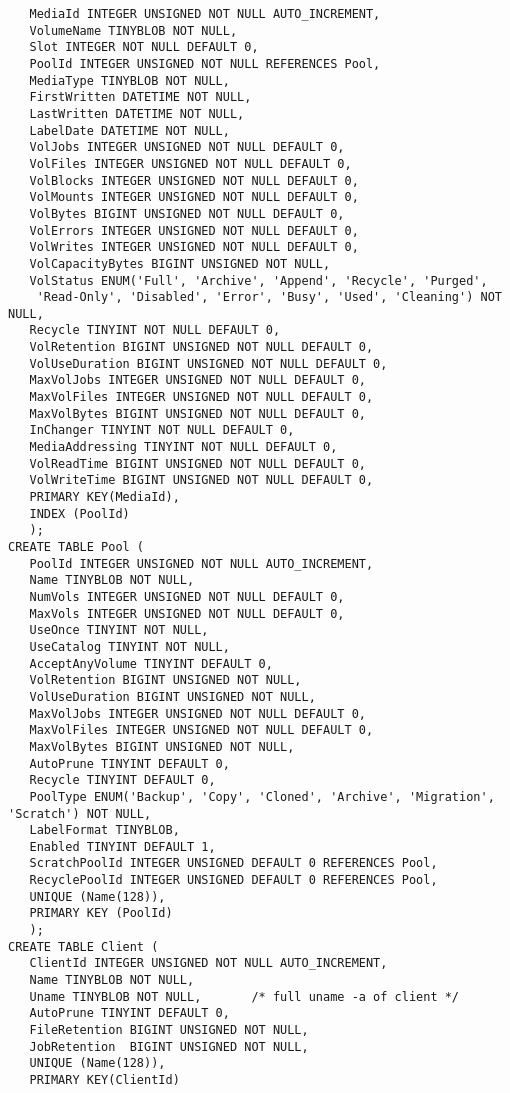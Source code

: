 {{{\begin{verbatim}
   MediaId INTEGER UNSIGNED NOT NULL AUTO_INCREMENT,
   VolumeName TINYBLOB NOT NULL,
   Slot INTEGER NOT NULL DEFAULT 0,
   PoolId INTEGER UNSIGNED NOT NULL REFERENCES Pool,
   MediaType TINYBLOB NOT NULL,
   FirstWritten DATETIME NOT NULL,
   LastWritten DATETIME NOT NULL,
   LabelDate DATETIME NOT NULL,
   VolJobs INTEGER UNSIGNED NOT NULL DEFAULT 0,
   VolFiles INTEGER UNSIGNED NOT NULL DEFAULT 0,
   VolBlocks INTEGER UNSIGNED NOT NULL DEFAULT 0,
   VolMounts INTEGER UNSIGNED NOT NULL DEFAULT 0,
   VolBytes BIGINT UNSIGNED NOT NULL DEFAULT 0,
   VolErrors INTEGER UNSIGNED NOT NULL DEFAULT 0,
   VolWrites INTEGER UNSIGNED NOT NULL DEFAULT 0,
   VolCapacityBytes BIGINT UNSIGNED NOT NULL,
   VolStatus ENUM('Full', 'Archive', 'Append', 'Recycle', 'Purged',
    'Read-Only', 'Disabled', 'Error', 'Busy', 'Used', 'Cleaning') NOT NULL,
   Recycle TINYINT NOT NULL DEFAULT 0,
   VolRetention BIGINT UNSIGNED NOT NULL DEFAULT 0,
   VolUseDuration BIGINT UNSIGNED NOT NULL DEFAULT 0,
   MaxVolJobs INTEGER UNSIGNED NOT NULL DEFAULT 0,
   MaxVolFiles INTEGER UNSIGNED NOT NULL DEFAULT 0,
   MaxVolBytes BIGINT UNSIGNED NOT NULL DEFAULT 0,
   InChanger TINYINT NOT NULL DEFAULT 0,
   MediaAddressing TINYINT NOT NULL DEFAULT 0,
   VolReadTime BIGINT UNSIGNED NOT NULL DEFAULT 0,
   VolWriteTime BIGINT UNSIGNED NOT NULL DEFAULT 0,
   PRIMARY KEY(MediaId),
   INDEX (PoolId)
   );
CREATE TABLE Pool (
   PoolId INTEGER UNSIGNED NOT NULL AUTO_INCREMENT,
   Name TINYBLOB NOT NULL,
   NumVols INTEGER UNSIGNED NOT NULL DEFAULT 0,
   MaxVols INTEGER UNSIGNED NOT NULL DEFAULT 0,
   UseOnce TINYINT NOT NULL,
   UseCatalog TINYINT NOT NULL,
   AcceptAnyVolume TINYINT DEFAULT 0,
   VolRetention BIGINT UNSIGNED NOT NULL,
   VolUseDuration BIGINT UNSIGNED NOT NULL,
   MaxVolJobs INTEGER UNSIGNED NOT NULL DEFAULT 0,
   MaxVolFiles INTEGER UNSIGNED NOT NULL DEFAULT 0,
   MaxVolBytes BIGINT UNSIGNED NOT NULL,
   AutoPrune TINYINT DEFAULT 0,
   Recycle TINYINT DEFAULT 0,
   PoolType ENUM('Backup', 'Copy', 'Cloned', 'Archive', 'Migration', 'Scratch') NOT NULL,
   LabelFormat TINYBLOB,
   Enabled TINYINT DEFAULT 1,
   ScratchPoolId INTEGER UNSIGNED DEFAULT 0 REFERENCES Pool,
   RecyclePoolId INTEGER UNSIGNED DEFAULT 0 REFERENCES Pool,
   UNIQUE (Name(128)),
   PRIMARY KEY (PoolId)
   );
CREATE TABLE Client (
   ClientId INTEGER UNSIGNED NOT NULL AUTO_INCREMENT,
   Name TINYBLOB NOT NULL,
   Uname TINYBLOB NOT NULL,       /* full uname -a of client */
   AutoPrune TINYINT DEFAULT 0,
   FileRetention BIGINT UNSIGNED NOT NULL,
   JobRetention  BIGINT UNSIGNED NOT NULL,
   UNIQUE (Name(128)),
   PRIMARY KEY(ClientId)

\end{verbatim}}}}

